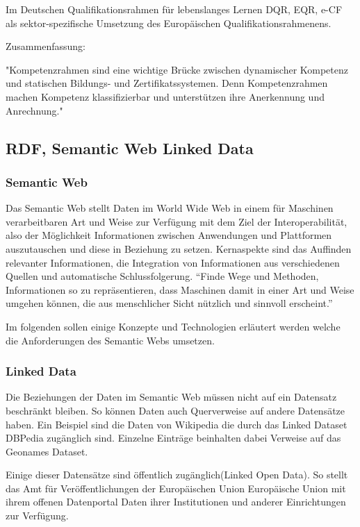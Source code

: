 Im Deutschen Qualifikationsrahmen für lebenslanges Lernen DQR, EQR, e-CF als sektor-spezifische Umsetzung des Europäischen Qualifikationsrahmenens.




Zusammenfassung:

"Kompetenzrahmen sind eine wichtige Brücke zwischen dynamischer Kompetenz und statischen Bildungs- und Zertifikatssystemen.
Denn Kompetenzrahmen machen Kompetenz klassifizierbar und unterstützen ihre Anerkennung und Anrechnung."


\subsection{RDF, Semantic Web  Linked Data}\label{semantic_web}
\subsubsection{Semantic Web}
Das Semantic Web stellt Daten im World Wide Web in einem für Maschinen verarbeitbaren Art und Weise zur Verfügung mit dem Ziel der Interoperabilität, also der Möglichkeit Informationen zwischen Anwendungen und Plattformen auszutauschen und diese in Beziehung zu setzen. Kernaspekte sind das Auffinden relevanter Informationen, die Integration von Informationen aus verschiedenen Quellen und automatische Schlussfolgerung.
“Finde Wege und Methoden, Informationen so zu repräsentieren, dass Maschinen damit in einer Art und Weise umgehen können, die aus menschlicher Sicht nützlich und sinnvoll erscheint.”\cite[12]{Hitzler2007}
 
Im folgenden sollen einige Konzepte und Technologien erläutert werden welche die Anforderungen des Semantic Webs umsetzen.
 
\subsubsection{Linked Data}

Die Beziehungen der Daten im Semantic Web müssen nicht auf ein Datensatz beschränkt bleiben. So können Daten auch Querverweise auf andere Datensätze haben. Ein Beispiel sind die Daten von Wikipedia die durch das Linked Dataset DBPedia zugänglich sind. Einzelne Einträge beinhalten dabei Verweise auf das Geonames Dataset.

Einige dieser Datensätze sind öffentlich zugänglich(Linked Open Data). So stellt das Amt für Veröffentlichungen der Europäischen Union Europäische Union mit ihrem offenen Datenportal Daten ihrer Institutionen und anderer Einrichtungen zur Verfügung. 
 
